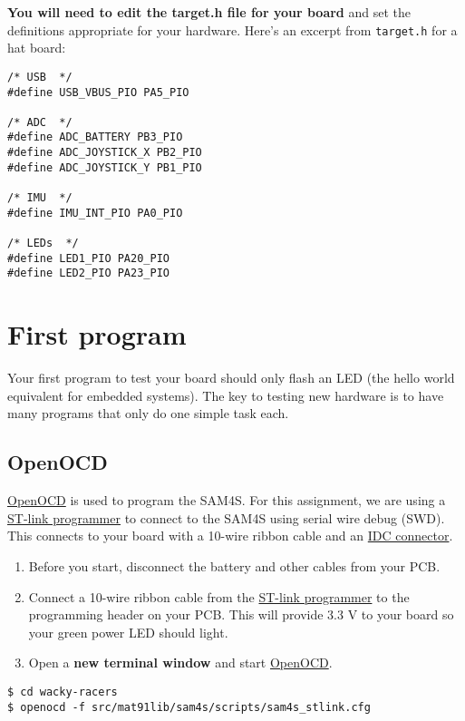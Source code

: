 \textbf{You will need to edit the target.h file for your board} and set
the definitions appropriate for your hardware. Here's an excerpt from
\texttt{target.h} for a hat board:

\begin{verbatim}
/* USB  */
#define USB_VBUS_PIO PA5_PIO

/* ADC  */
#define ADC_BATTERY PB3_PIO
#define ADC_JOYSTICK_X PB2_PIO
#define ADC_JOYSTICK_Y PB1_PIO

/* IMU  */
#define IMU_INT_PIO PA0_PIO

/* LEDs  */
#define LED1_PIO PA20_PIO
#define LED2_PIO PA23_PIO
\end{verbatim}

\section{First program}
\label{first-program}

Your first program to test your board should only flash an LED (the
hello world equivalent for embedded systems). The key to testing new
hardware is to have many programs that only do one simple task each.

\subsection{OpenOCD}
\label{openocd}

\url{OpenOCD} is used to program the SAM4S. For this assignment, we are
using a \href{ST-link_programmer}{ST-link programmer} to connect to the
SAM4S using serial wire debug (SWD). This connects to your board with a
10-wire ribbon cable and an \href{IDC_connector}{IDC connector}.

\begin{enumerate}
\item
  Before you start, disconnect the battery and other cables from your
  PCB.
\item
  Connect a 10-wire ribbon cable from the
  \href{ST-link_programmer}{ST-link programmer} to the programming
  header on your PCB. This will provide 3.3 V to your board so your
  green power LED should light.
\item
  Open a \textbf{new terminal window} and start \url{OpenOCD}.
\end{enumerate}

\begin{verbatim}
$ cd wacky-racers
$ openocd -f src/mat91lib/sam4s/scripts/sam4s_stlink.cfg
\end{verbatim}

